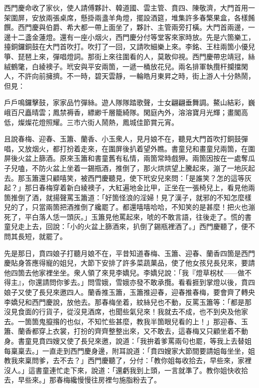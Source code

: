西門慶命收了家伙，使人請傅夥計、韓道國、雲主管、賁四、陳敬濟，大門首用一架圍屏，安放兩張桌席，懸掛兩盞羊角燈，擺設酒筵，堆集許多春檠果盒，各樣餚饌。西門慶與伯爵、希大都一帶上面坐了，夥計、主管兩旁打橫。大門首兩邊，一邊十二盞金蓮燈。還有一座小烟火，西門慶分付等堂客來家時放。先是六箇樂工，擡銅鑼銅鼓在大門首吹打。吹打了一回，又請吹細樂上來。李銘、王柱兩箇小優兒箏、琵琶上來，彈唱燈詞。那街上來往圍看的人，莫敢仰視。西門慶帶忠靖冠，絲絨鶴氅，白綾襖子。玳安與平安兩箇，一遞一桶放花兒。兩名排軍執攬杆攔擋閑人，不許向前擁擠。不一時，碧天雲靜，一輪皓月東昇之時，街上游人十分熱鬧，但見：

\begin{myquote}
戶戶鳴鑼擊鼓，家家品竹彈絲。遊人隊隊踏歌聲，士女翩翩垂舞調。鰲山結彩，巍峨百尺矗晴雲；鳳禁褥香，縹緲千層籠綺隊。閑庭內外，溶溶寶月光輝；畫閣高低，燦燦花燈照耀。三市六街人鬧熱，鳳城佳節賞元宵。
\end{myquote}

且說春梅、迎春、玉簫、蘭香、小玉衆人，見月娘不在，聽見大門首吹打銅鼓彈唱，又放烟火，都打扮着走來，在圍屏後扒着望外瞧。書童兒和畫童兒兩箇，在圍屏後火盆上篩酒。原來玉簫和書童舊有私情，兩箇常時戲狎。兩箇因按在一處奪瓜子兒嗑，不防火盆上坐着一錫瓶酒，推倒了，那火烘烘望上騰起來，漰了一地灰起去。那玉簫還只顧嘻笑，被西門慶聽見，使下玳安兒來問：「是誰笑？怎的這等灰起？」那日春梅穿着新白綾襖子，大紅遍地金比甲，正坐在一張椅兒上，看見他兩箇推倒了酒，就揚聲罵玉簫道：「好箇怪浪的淫婦！見了漢子，就邪的不知怎麼樣兒的了，只當兩箇把酒推倒了纔罷了。都還嘻嘻哈哈，不知笑的是甚麼！把火也漰死了，平白落人恁一頭灰。」玉簫見他罵起來，唬的不敢言語，往後走了。慌的書童兒走上去，回說：「小的火盆上篩酒來，扒倒了錫瓶裡酒了。」西門慶聽了，便不問其長短，就罷了。

先是那日，賁四娘子打聽月娘不在，平昔知道春梅、玉簫、迎春、蘭香四箇是西門慶貼身答應得寵的姐兒，大節下安排了許多菜蔬菓品，使了他女孩兒長兒來，要請他四箇去他家裡坐坐。衆人領了來見李嬌兒。李嬌兒說：「我『燈草柺杖——做不得主』，你還請問你爹去。」問雪娥，雪娥亦發不敢承攬。看看捱到掌燈以後，賁四娘子又使了長兒來邀四人。蘭香推玉簫，玉簫推迎春，迎春推春梅，要會齊了轉央李嬌兒和西門慶說，放他去。那春梅坐着，紋絲兒也不動，反罵玉簫等：「都是那沒見食面的行貨子，從沒見酒席，也聞些氣兒來！我就去不成，也不到央及他家去。一箇箇鬼攛揝的也似，不知忙些甚麼，教我半箇眼兒看的上！」那迎春、玉簫、蘭香都穿上衣裳，打扮的齊齊整整出來，又不敢去，這春梅又只顧坐着不動身。書童見賁四嫂又使了長兒來邀，說道：「我拚着爹罵兩句也罷，等我上去替姐每稟稟去。」一直走到西門慶身邊，附耳說道：「賁四嫂家大節間要請姐每坐坐，姐教我來稟問爹，去不去？」西門慶聽了，分付：「教你姐每收拾去，早些來，家裡沒人。」這書童連忙走下來，說道：「還虧我到上頭，一言就準了。教你姐快收拾去，早些來。」那春梅纔慢慢往房裡勻施脂粉去了。

